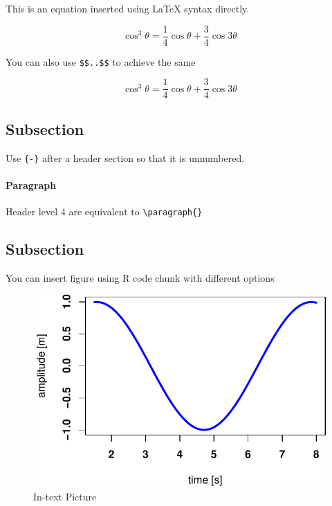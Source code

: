 \documentclass[fleqn,10pt,lineno]{wlpeerj} %
\begin{document}
This is an equation inserted using LaTeX syntax directly.

\begin{equation}
\cos^3 \theta =\frac{1}{4}\cos\theta+\frac{3}{4}\cos 3\theta
\label{eq:refname2}
\end{equation}

You can also use \texttt{\$\$..\$\$} to achieve the same

\[
\cos^3 \theta =\frac{1}{4}\cos\theta+\frac{3}{4}\cos 3\theta
\]

\hypertarget{subsection}{%
\subsection*{Subsection}\label{subsection}}

Use \texttt{\{-\}} after a header section so that it is unnumbered.

\hypertarget{paragraph}{%
\paragraph{Paragraph}\label{paragraph}}

Header level 4 are equivalent to \texttt{\textbackslash{}paragraph\{\}}

\hypertarget{subsection-1}{%
\subsection*{Subsection}\label{subsection-1}}

You can insert figure using R code chunk with different options

\begin{figure}
\includegraphics[width=1\linewidth]{gibson2021_files/figure-latex/results-1} \caption{In-text Picture}\label{fig:results}
\end{figure}
\end{document}
